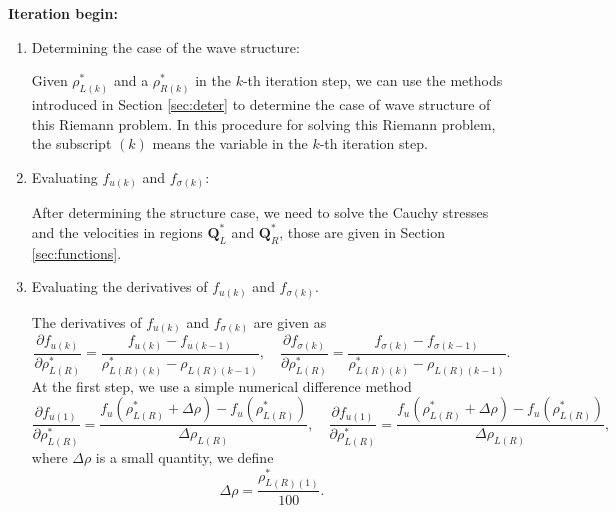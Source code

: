 \documentclass{article}
\numberwithin{equation}{section}
\numberwithin{table}{section}
\begin{document}
\noindent
\textbf{Iteration begin:}
\begin{enumerate}[Step 1]
  \item Determining the case of the wave structure:

	Given $\rho _{L(k)}^*$ and a  $\rho _{R(k)}^*$ in the $k$-th  iteration step, we can use the methods introduced in Section \ref{sec:deter} to determine the case of wave structure of this Riemann problem. In this procedure for solving this Riemann problem, the subscript $(k)$ means the variable in the $k$-th  iteration step.

  \item Evaluating $f_{u(k)}$ and $f_{\sigma(k)}$:

  After determining the structure case, we need  to solve the Cauchy stresses and the velocities in regions $\mathbf{Q}^*_L$ and $\mathbf{Q}^*_R$, those are given in Section \ref{sec:functions}.

  \item Evaluating the derivatives of $f_{u(k)}$ and $f_{\sigma(k)}$.

The derivatives of $f_{u(k)}$ and $f_{\sigma(k)}$ are given as
\begin{equation}
  \frac{\partial f_{u(k)}}{\partial \rho^*_{L(R)}} = \frac{f_{u(k)}-f_{u(k-1)}}{\rho_{L(R)(k)}^* - \rho_{L(R)(k-1)}},\quad
  \frac{\partial f_{\sigma(k)}}{\partial \rho^*_{L(R)}} = \frac{f_{\sigma(k)}-f_{\sigma(k-1)}}{\rho_{L(R)(k)}^* - \rho_{L(R)(k-1)}}.
\end{equation}
At the first step, we use a simple  numerical difference  method
\begin{equation}
  \frac{\partial f_{u(1)}}{\partial \rho^*_{L(R)}} = \frac{f_{u}(\rho^*_{L(R)}+\Delta \rho)-f_{u}(\rho^*_{L(R)})}{\Delta \rho_{L(R)}},\quad
  \frac{\partial f_{u(1)}}{\partial \rho^*_{L(R)}} = \frac{f_{u}(\rho^*_{L(R)}+\Delta \rho)-f_{u}(\rho^*_{L(R)})}{\Delta \rho_{L(R)}},
\end{equation}
where $\Delta \rho$ is a small quantity, we define
\begin{equation}
  \Delta \rho = \frac{\rho_{L(R)(1)}^*}{100}.
\end{equation}


\end{enumerate}
\end{document}
